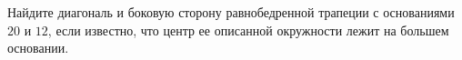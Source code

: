 \begin{ex}
	\begin{condition}
		Найдите диагональ и боковую сторону равнобедренной трапеции с основаниями \( 20  \) и \( 12 \), если известно, что центр ее описанной окружности лежит на большем основании.
	\end{condition}
\end{ex}